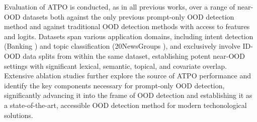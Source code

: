 Evaluation of ATPO is conducted, as in all previous works, over a range of near-OOD datasets both against the only previous prompt-only OOD detection method \cite{wang2024beyond} and against traditional OOD detection methods with access to features and logits. Datasets span various application domains, including intent detection (Banking \cite{casanueva2020efficient}) and topic classification (20NewsGroups \cite{lang1995newsweeder}), and exclusively involve ID-OOD data splits from within the same dataset, establishing potent near-OOD settings with significant lexical, semantic, topical, and covariate overlap. Extensive ablation studies further explore the source of ATPO performance and identify the key components necessary for prompt-only OOD detection, significantly advancing it into the frame of OOD detection and establishing it as a state-of-the-art, accessible OOD detection method for modern techonological solutions.
